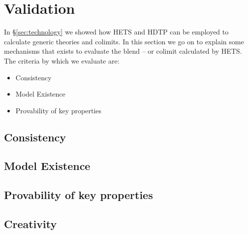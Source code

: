 \section{Validation} \label{sec:validation}

In \S\ref{sec:technology} we showed how HETS and HDTP can be employed
to calculate generic theories and colimits. In this section we go on
to explain some mechanisms that exists to evaluate the blend -- or
colimit calculated by HETS. The criteria by which we evaluate are:
\begin{itemize}
\item{Consistency}
\item{Model Existence}
\item{Provability of key properties}
\end{itemize}

\subsection{Consistency}


\subsection{Model Existence}


\subsection{Provability of key properties}

\subsection{Creativity}
